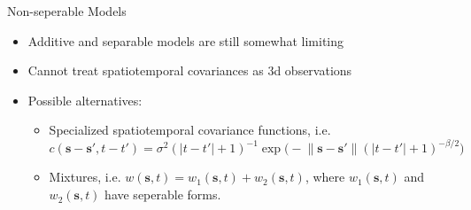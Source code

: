 \documentclass[11pt,ignorenonframetext,]{beamer}
\providecommand{\tightlist}{%
  \setlength{\itemsep}{0pt}\setlength{\parskip}{0pt}}
\begin{document}
\begin{frame}[t]{Non-seperable Models}

\begin{itemize}
\tightlist
\item
  Additive and separable models are still somewhat limiting
\end{itemize}

\vspace{2mm}

\begin{itemize}
\tightlist
\item
  Cannot treat spatiotemporal covariances as 3d observations
\end{itemize}

\vspace{2mm}

\begin{itemize}
\item
  Possible alternatives:

  \begin{itemize}
  \tightlist
  \item
    Specialized spatiotemporal covariance functions, i.e. \[ 
    c(\bm{s}-\bm{s}', t-t') 
    = \sigma^2 (\lvert t - t'\rvert+1)^{-1} \exp\big(-\lVert\bm{s}-\bm{s}'\rVert (\lvert t-t' \rvert + 1)^{-\beta/2}\big)
    \] \[ ~ \]
  \item
    Mixtures, i.e. \(w(\bm{s},t) = w_1(\bm{s},t) + w_2(\bm{s},t)\),
    where \(w_1(\bm{s},t)\) and \(w_2(\bm{s},t)\) have seperable forms.
  \end{itemize}
\end{itemize}

\end{frame}
\end{document}
